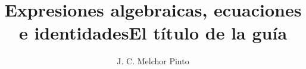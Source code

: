 \documentclass[12pt,addpoints,answers]{guia}
\title{Expresiones algebraicas, ecuaciones e identidades}
\title{El título de la guía}
\author{J. C. Melchor Pinto}
\begin{document}
\pagestyle{headandfoot}

\INFO
\printanswers
\vspace{-0.5cm}
\begin{multicols}{2}
    
    \columnbreak
    
    
    
\end{multicols}

\begin{questions}
    \questionboxed[10]{}
    \questionboxed[10]{}
    \questionboxed[10]{}
    \questionboxed[10]{}
    \questionboxed[10]{}
    \questionboxed[10]{}
    \questionboxed[10]{}
    \questionboxed[10]{}
    \questionboxed[10]{}
    \questionboxed[10]{}
\end{questions}
\end{document}
